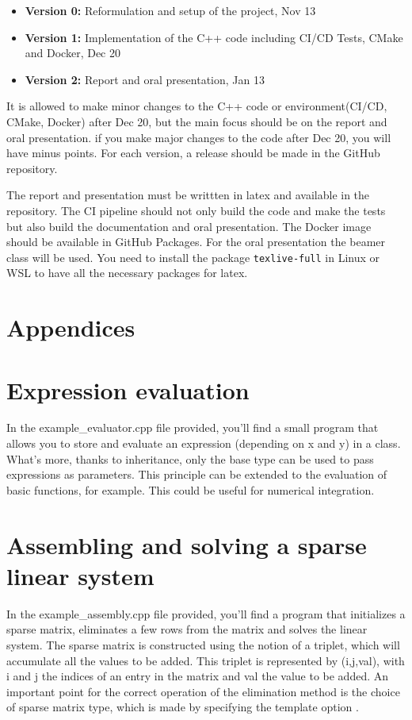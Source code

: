 \documentclass[11pt,a4paper]{article}
\begin{document}
\begin{itemize}
    \item \textbf{Version 0:} Reformulation and setup of the project, Nov 13
    \item \textbf{Version 1:} Implementation of the C++ code including CI/CD Tests, CMake and Docker, Dec 20
    \item \textbf{Version 2:} Report and oral presentation, Jan 13
\end{itemize}

It is allowed to make minor changes to the C++ code or environment(CI/CD, CMake, Docker) after Dec 20, but the main focus should be on the report and oral presentation.
if you make major changes to the code after Dec 20, you will have minus points.
For each version, a release should be made in the GitHub repository.

The report and presentation must be writtten in latex and available in the repository. 
The CI pipeline should not only build the code and make the tests but also build the documentation and oral presentation. 
The Docker image should be available in GitHub Packages.
For the oral presentation the beamer class will be used.
You need to install the package \texttt{texlive-full} in Linux or WSL to have all the necessary packages for latex.

\section*{Appendices}

\section*{Expression evaluation}
In the example\_evaluator.cpp file provided, you'll find a small program that allows you to store and evaluate an expression (depending on x and y) in a class.
What's more, thanks to inheritance, only the base type can be used to pass expressions as parameters.
This principle can be extended to the evaluation of basic functions, for example.
This could be useful for numerical integration.

\section*{Assembling and solving a sparse linear system}

In the example\_assembly.cpp file provided, you'll find a program that initializes a sparse matrix, eliminates a few rows from the matrix and solves the linear system.
The sparse matrix is constructed using the notion of a triplet, which will accumulate all the values to be added.
This triplet is represented by (i,j,val), with i and j the indices of an entry in the matrix and val the value to be added.
An important point for the correct operation of the elimination method is the choice of sparse matrix type, which is made by specifying the template option .
\end{document}
